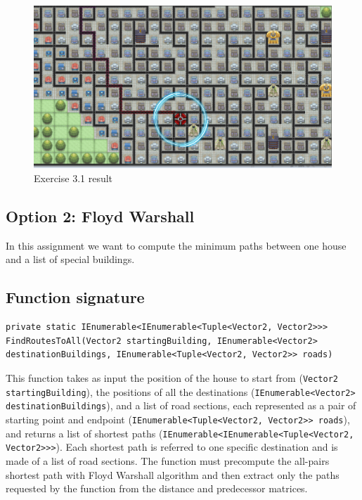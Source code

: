 \documentclass[10pt,a4paper]{article}
\begin{document}
\begin{figure}
\centering
\includegraphics[scale=0.2]{img/exercise3}
\caption{Exercise 3.1 result}
\label{img:Ex3-1}
\end{figure}


\subsection*{Option 2: Floyd Warshall}
In this assignment we want to compute the minimum paths between one house and a list of special buildings. 

\subsection*{Function signature} 
\begin{lstlisting}
private static IEnumerable<IEnumerable<Tuple<Vector2, Vector2>>> FindRoutesToAll(Vector2 startingBuilding, IEnumerable<Vector2> destinationBuildings, IEnumerable<Tuple<Vector2, Vector2>> roads)
\end{lstlisting}

\noindent
This function takes as input the position of the house to start from (\texttt{Vector2 startingBuilding}), the positions of all the destinations (\texttt{IEnumerable<Vector2> destinationBuildings}), and a list of road sections, each represented as a pair of starting point and endpoint (\texttt{IEnumerable<Tuple<Vector2, Vector2>> roads}), and returns a list of shortest paths (\texttt{IEnumerable<IEnumerable<Tuple<Vector2, Vector2>>>}). Each shortest path is referred to one specific destination and is made of a list of road sections.
The function must precompute the all-pairs shortest path with Floyd Warshall algorithm and then extract only the paths requested by the function from the distance and predecessor matrices.\\
\end{document}
